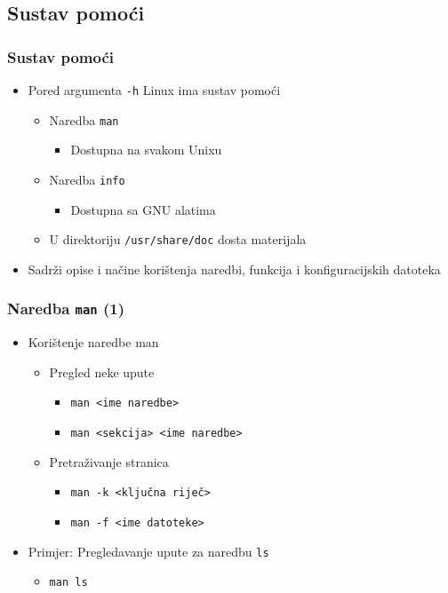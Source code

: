 \documentclass{beamer}
\newcommand{\shell}[1]{\texttt{#1}}
\begin{document}
\subsection{Sustav pomoći}
\begin{frame}[t]
\frametitle{Sustav pomoći}
\begin{itemize}
  \item Pored argumenta \shell{-h} Linux ima sustav pomoći
  \begin{itemize}
    \item Naredba \shell{man}
    \begin{itemize}
      \item Dostupna na svakom Unixu
    \end{itemize}
    \item Naredba \shell{info}
    \begin{itemize}
      \item Dostupna sa GNU alatima
    \end{itemize}
    \item U direktoriju \shell{/usr/share/doc} dosta materijala
  \end{itemize}
  \item Sadrži opise i načine korištenja naredbi, funkcija i
        konfiguracijskih datoteka
\end{itemize}
\end{frame}

\begin{frame}[t]
\frametitle{Naredba \shell{man} (1)}
\begin{itemize}
  \item Korištenje naredbe man
  \begin{itemize}
    \item Pregled neke upute
    \begin{itemize}
      \item \shell{man <ime naredbe>}
      \item \shell{man <sekcija> <ime naredbe>}
    \end{itemize}
    \item Pretraživanje stranica
    \begin{itemize}
      \item \shell{man -k <ključna riječ>}
      \item \shell{man -f <ime datoteke>}
    \end{itemize}
  \end{itemize}
  \item Primjer: Pregledavanje upute za naredbu \shell{ls}
  \begin{itemize}
    \item \shell{man ls}
  \end{itemize}
\end{itemize}
\end{frame}
\end{document}
